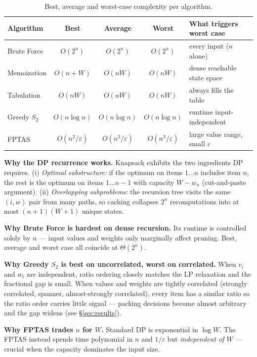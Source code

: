 \documentclass[11pt, a4paper]{article}
\begin{document}
\begin{table}[H]
\centering
\caption{Best, average and worst-case complexity per algorithm.}
\small
\begin{tabular}{@{}lcccp{4.8cm}@{}}
\toprule
\textbf{Algorithm} & \textbf{Best} & \textbf{Average} & \textbf{Worst} & \textbf{What triggers worst case} \\
\midrule
Brute Force        & $O(2^n)$ & $O(2^n)$ & $O(2^n)$ & every input ($n$ alone) \\
Memoization        & $O(n+W)$ & $O(nW)$ & $O(nW)$ & dense reachable state space \\
Tabulation         & $O(nW)$  & $O(nW)$ & $O(nW)$ & always fills the table \\
Greedy $S_2$       & $O(n\log n)$ & $O(n\log n)$ & $O(n\log n)$ & runtime input-independent \\
FPTAS              & $O(n^2/\varepsilon)$ & $O(n^3/\varepsilon)$ & $O(n^3/\varepsilon)$ & large value range, small $\varepsilon$ \\
\bottomrule
\end{tabular}
\end{table}

\textbf{Why the DP recurrence works.} Knapsack exhibits the two ingredients DP
requires. (i) \emph{Optimal substructure:} if the optimum on items $1{\ldots}n$
includes item $n$, the rest is the optimum on items $1{\ldots}n{-}1$ with capacity
$W{-}w_n$ (cut-and-paste argument). (ii) \emph{Overlapping subproblems:} the
recursion tree visits the same $(i,w)$ pair from many paths, so caching collapses
$2^n$ recomputations into at most $(n{+}1)(W{+}1)$ unique states.

\textbf{Why Brute Force is hardest on dense recursion.} Its runtime is controlled
solely by $n$ --- input values and weights only marginally affect pruning. Best,
average and worst case all coincide at $\Theta(2^n)$.

\textbf{Why Greedy $S_2$ is best on uncorrelated, worst on correlated.} When
$v_i$ and $w_i$ are independent, ratio ordering closely matches the LP relaxation
and the fractional gap is small. When values and weights are tightly correlated
(strongly correlated, spanner, almost-strongly correlated), every item has a
similar ratio so the ratio order carries little signal --- packing decisions
become almost arbitrary and the gap widens (see \S\ref{sec:results}).

\textbf{Why FPTAS trades $n$ for $W$.} Standard DP is exponential in $\log W$.
The FPTAS instead spends time polynomial in $n$ and $1/\varepsilon$ but
\emph{independent of $W$} --- crucial when the capacity dominates the input size.
\end{document}
